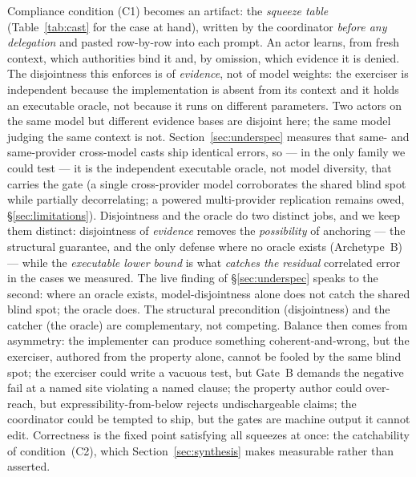 \documentclass[11pt]{article}
\begin{document}
Compliance condition (C1) becomes an artifact: the \emph{squeeze table}
(Table~\ref{tab:cast} for the case at hand), written by the coordinator
\emph{before any delegation} and pasted row-by-row into each prompt. An actor learns,
from fresh context, which authorities bind it and, by omission, which evidence it is
denied. The disjointness this enforces is of \emph{evidence}, not of model weights:
the exerciser is independent because the implementation is absent from its context and
it holds an executable oracle, not because it runs on different parameters. Two actors
on the same model but different evidence bases are disjoint here; the same model
judging the same context is not.
Section~\ref{sec:underspec} measures that same- and same-provider cross-model casts ship identical
errors, so --- in the only family we could test --- it is the independent executable oracle, not model
diversity, that carries the gate (a single cross-provider model corroborates the shared blind
spot while partially decorrelating; a powered multi-provider replication remains owed,
\S\ref{sec:limitations}). Disjointness and the oracle do two distinct jobs, and we keep them
distinct: disjointness of \emph{evidence} removes the \emph{possibility} of anchoring --- the
structural guarantee, and the only defense where no oracle exists (Archetype~B) --- while the
\emph{executable lower bound} is what \emph{catches the residual} correlated error in the cases
we measured. The live finding of \S\ref{sec:underspec} speaks to the second: where an oracle
exists, model-disjointness alone does not catch the shared blind spot; the oracle does. The
structural precondition (disjointness) and the catcher (the oracle) are complementary, not competing.
Balance then comes from asymmetry: the implementer can produce
something coherent-and-wrong, but the exerciser, authored from the property alone, cannot be
fooled by the same blind spot; the exerciser could write a vacuous test, but Gate~B demands the
negative fail at a named site violating a named clause; the property author could over-reach,
but expressibility-from-below rejects undischargeable claims; the coordinator could be tempted
to ship, but the gates are machine output it cannot edit. Correctness is the fixed point
satisfying all squeezes at once: the catchability of condition~(C2), which
Section~\ref{sec:synthesis} makes measurable rather than asserted.
\end{document}

